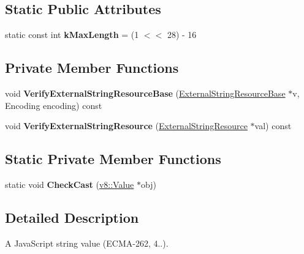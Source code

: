 \subsection*{Static Public Attributes}
\begin{DoxyCompactItemize}
\item 
static const int {\bfseries k\+Max\+Length} = (1 $<$$<$ 28) -\/ 16\hypertarget{classv8_1_1_string_a51272e8a71006385863586afb2bb4a62}{}\label{classv8_1_1_string_a51272e8a71006385863586afb2bb4a62}

\end{DoxyCompactItemize}
\subsection*{Private Member Functions}
\begin{DoxyCompactItemize}
\item 
void {\bfseries Verify\+External\+String\+Resource\+Base} (\hyperlink{classv8_1_1_string_1_1_external_string_resource_base}{External\+String\+Resource\+Base} $\ast$v, Encoding encoding) const \hypertarget{classv8_1_1_string_a71db8b67a4af9f37664171272644ccc1}{}\label{classv8_1_1_string_a71db8b67a4af9f37664171272644ccc1}

\item 
void {\bfseries Verify\+External\+String\+Resource} (\hyperlink{classv8_1_1_string_1_1_external_string_resource}{External\+String\+Resource} $\ast$val) const \hypertarget{classv8_1_1_string_a9322ad76d54c0f4f6d276a146535354a}{}\label{classv8_1_1_string_a9322ad76d54c0f4f6d276a146535354a}

\end{DoxyCompactItemize}
\subsection*{Static Private Member Functions}
\begin{DoxyCompactItemize}
\item 
static void {\bfseries Check\+Cast} (\hyperlink{classv8_1_1_value}{v8\+::\+Value} $\ast$obj)\hypertarget{classv8_1_1_string_aee1a2cddf49a77f23e8b1d9aeda11841}{}\label{classv8_1_1_string_aee1a2cddf49a77f23e8b1d9aeda11841}

\end{DoxyCompactItemize}


\subsection{Detailed Description}
A Java\+Script string value (E\+C\+M\+A-\/262, 4..). 

